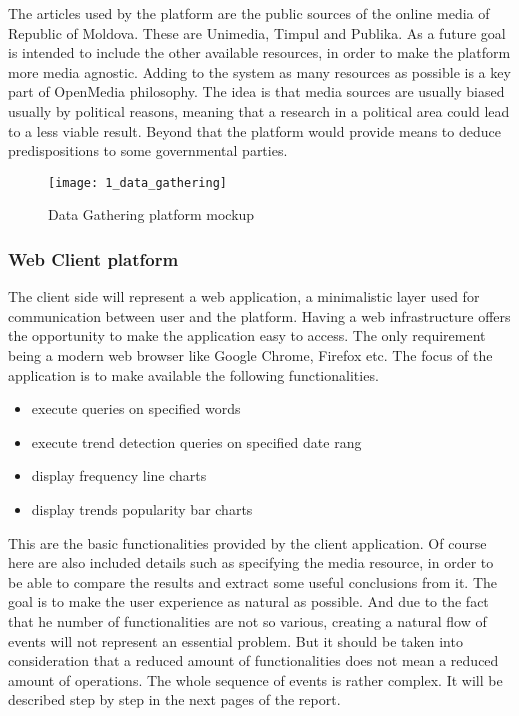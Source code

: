 The articles used by the platform are the public sources of the online media of Republic of Moldova. These are Unimedia, Timpul and Publika. As a future goal is intended to include the other available resources, in order to make the platform more media agnostic. Adding to the system as many resources as possible is a key part of OpenMedia philosophy. The idea is that media sources are usually biased usually by political reasons, meaning that a research in a political area could lead to a less viable result. Beyond that the platform would provide means to deduce predispositions to some governmental parties.

\begin{figure}[!ht]
\centering
\texttt{[image: 1\_data\_gathering]}
\caption{Data Gathering platform mockup}\label{data_gathering_mock}
\end{figure}

\subsubsection{Web Client platform}
The client side will represent a web application, a minimalistic layer used for communication between user and the platform. Having a web infrastructure offers the opportunity to make the application easy to access. The only requirement being a modern web browser like Google Chrome, Firefox etc. The focus of the application is to make available the following functionalities.
\begin{itemize}
    \item execute queries on specified words
    \item execute trend detection queries on specified date rang
    \item display frequency line charts
    \item display trends popularity bar charts
\end{itemize}

This are the basic functionalities provided by the client application. Of course here are also included details such as specifying the media resource, in order to be able to compare the results and extract some useful conclusions from it. The goal is to make the user experience as natural as possible. And due to the fact that he number of functionalities are not so various, creating a natural flow of events will not represent an essential problem. But it should be taken into consideration that a reduced amount of functionalities does not mean a reduced amount of operations. The whole sequence of events is rather complex. It will be described step by step in the next pages of the report.

